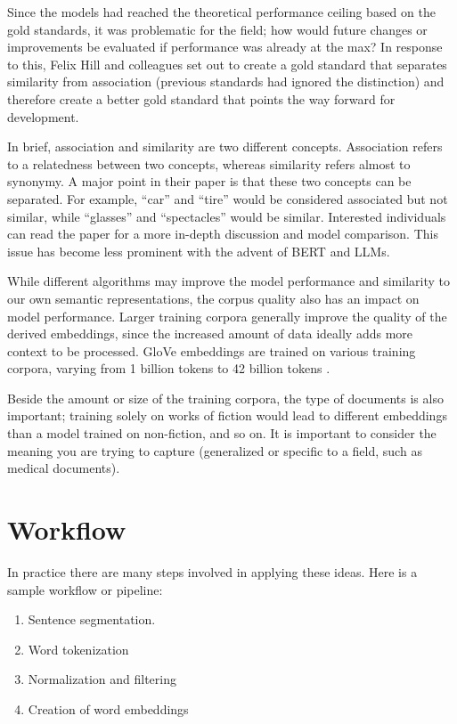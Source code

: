 Since the models had reached the theoretical performance ceiling based on the gold standards, it was problematic for the field; how would future changes or improvements be evaluated if performance was already at the max?
In response to this, Felix Hill and colleagues \cite{hill2015simlex} set out to create a gold standard that separates similarity from association (previous standards had ignored the distinction) and therefore create a better gold standard that points the way forward for development. 

In brief, association and similarity are two different concepts. Association refers to a relatedness between two concepts, whereas similarity refers almost to synonymy. A major point in their paper \cite{hill2015simlex} is that these two concepts can be separated.
For example, ``car'' and ``tire'' would be considered associated but not similar, while ``glasses'' and ``spectacles'' would be similar.
Interested individuals can read the paper for a more in-depth discussion and model comparison. This issue has become less prominent with the advent of BERT and LLMs.

While different algorithms may improve the model performance and similarity to our own semantic representations, the corpus quality also has an impact on model performance.
Larger training corpora generally improve the quality of the derived embeddings, since the increased amount of data ideally adds more context to be processed. 
GloVe embeddings are trained on various training corpora, varying from 1 billion tokens to 42 billion tokens \cite{pennington2014glove}.

Beside the amount or size of the training corpora, the type of documents is also important; training solely on works of fiction would lead to different embeddings than a model trained on non-fiction, and so on. It is important to consider the meaning you are trying to capture (generalized or specific to a field, such as medical documents).

\section{Workflow}

In practice there are many steps involved in applying these ideas. Here is a sample workflow or pipeline:
\begin{enumerate}
\item Sentence segmentation.
\item Word tokenization
\item Normalization and filtering
\item Creation of word embeddings
\end{enumerate}

